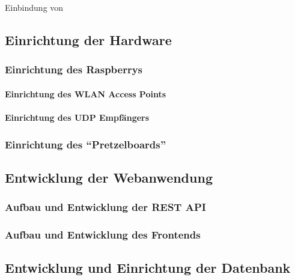 \documentclass[ngerman]{scrartcl} %
\begin{document}
Einbindung von 

\subsection{Einrichtung der Hardware}  
\label{sec:Einrichtung der Hardware-1} 

\subsubsection{Einrichtung des Raspberrys}  
\label{sec:Einrichtung des Raspberrys-1}

\paragraph{Einrichtung des WLAN Access Points}  
\label{sec:Einrichtung des WLAN Access Points-1} 

\paragraph{Einrichtung des UDP Empfängers}  
\label{sec:Einrichtung des UDP Empfängers-1} 

\subsubsection{Einrichtung des ``Pretzelboards''}  
\label{sec:Einrichtung des ``Pretzelboards''-1}

\subsection{Entwicklung der Webanwendung}  
\label{sec:Entwicklung der Webanwendung-1} 

\subsubsection{Aufbau und Entwicklung der REST API}  
\label{sec:Aufbau und Entwicklung der REST API-1}

\subsubsection{Aufbau und Entwicklung des Frontends}  
\label{sec:Aufbau und Entwicklung des Frontends-1}

\subsection{Entwicklung und Einrichtung der Datenbank}  
\label{sec:Entwicklung und Einrichtung der Datenbank-1} 
\end{document}

